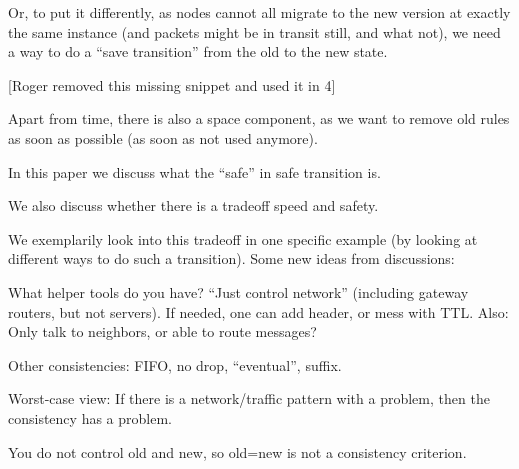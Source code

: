 Or, to put it differently, as nodes cannot all migrate to the new version at exactly the same instance (and packets might be in transit still, and what not), we need a way to do a ``save transition'' from the old to the new state.

[Roger removed this missing snippet and used it in 4]

Apart from time, there is also a space component, as we want to remove old rules as soon as possible (as soon as not used anymore).

In this paper we discuss what the ``safe'' in safe transition is.

We also discuss whether there is a tradeoff speed and safety.

We exemplarily look into this tradeoff in one specific example (by looking at different ways to do such a transition).
Some new ideas from discussions:

What helper tools do you have? ``Just control network'' (including gateway routers, but not servers). If needed, one can add header, or mess with TTL. Also: Only talk to neighbors, or able to route messages?

Other consistencies: FIFO, no drop, ``eventual'', suffix.

Worst-case view: If there is a network/traffic pattern with a problem, then the consistency has a problem.

You do not control old and new, so old=new is not a consistency criterion.



